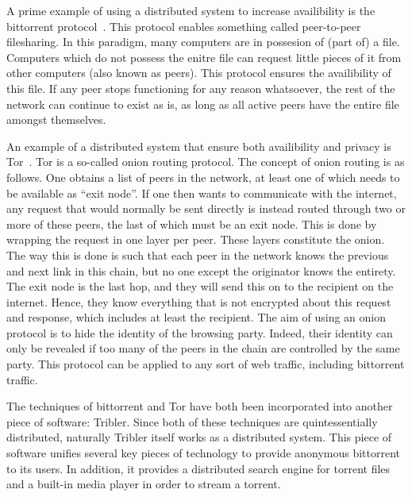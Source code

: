 \documentclass[a4paper,11pt]{book}
\theoremstyle{definition}
\begin{document}
A prime example of using a distributed system to increase availibility is the 
bittorrent protocol~\cite{cohen2008bittorrent}. This protocol enables something called peer-to-peer filesharing.
In this paradigm, many computers are in possesion of (part of) a file. Computers
which do not possess the enitre file can request little pieces of it from other
computers (also known as peers). This protocol ensures the availibility of this
file. If any peer stops functioning for any reason whatsoever, the rest of
the network can continue to exist as is, as long as all active peers have the
entire file amongst themselves. 

An example of a distributed system that ensure both availibility and privacy is
Tor~\cite{dingledine2004tor}. Tor is a so-called onion routing protocol. 
The concept of onion routing is as follows. One obtains a list of peers in the
network, at least one of which needs to be available as ``exit node''. If one
then wants to communicate with the internet, any request that would normally
be sent directly is instead routed through two or more of these peers, the last
of which must be an exit node. This is done by wrapping the request in one
layer per peer. These layers constitute the onion. The way this is done is such
that each peer in the network knows the previous and next link in this chain,
but no one except the originator knows the entirety. The exit node is the last
hop, and they will send this on to the recipient on the internet. Hence, they
know everything that is not encrypted about this request and response, which includes at
least the recipient. 
The aim of using an onion protocol is to hide the identity of the browsing party. Indeed,
their identity can only be revealed if too many of the peers in the chain are controlled
by the same party. This protocol can be applied to any sort of web traffic, including
bittorrent traffic. 

The techniques of bittorrent and Tor have both been incorporated into another piece
of software: Tribler. Since both of these techniques are quintessentially distributed,
naturally Tribler itself works as a distributed system. This piece of software unifies
several key pieces of technology to provide anonymous bittorrent to its users. In addition,
it provides a distributed search engine for torrent files and a built-in media player in
order to stream a torrent. 
\end{document}
